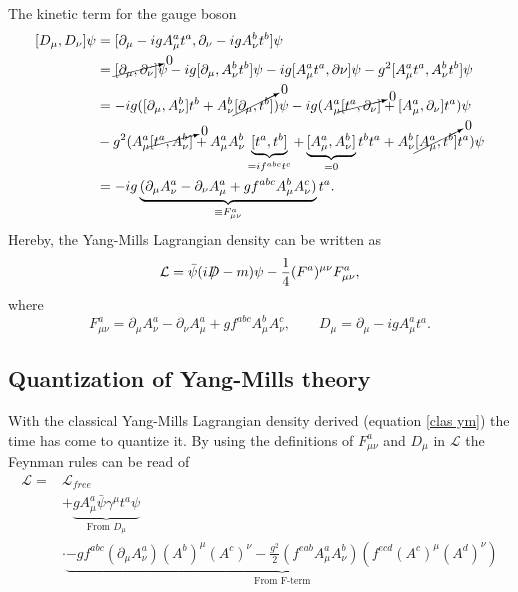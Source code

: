 The kinetic term for the gauge boson
\begin{equation}
	\begin{split}
		[D_\mu,D_\nu]\psi&=[\partial_\mu-igA_\mu^at^a,\partial_\nu-igA_\nu^bt^b]\psi\\
		&=\cancelto{0}{[\partial_\mu,\partial_\nu]}\psi-ig[\partial_\mu,A_\nu^bt^b]\psi-ig[A_\mu^at^a,\partial\nu]\psi-g^2[A_\mu^at^a,A_\nu^bt^b]\psi\\
		&=-ig([\partial_\mu,A_\nu^b]t^b+A_\nu^b\cancelto{0}{[\partial_\mu,t^b]})\psi-ig(A_\mu^a\cancelto{0}{[t^a,\partial_\nu]}+[A_\mu^a,\partial_\nu]t^a)\psi\\
		&-g^2(A_\mu^a\cancelto{0}{[t^a,A_\nu^b]}+A_\mu^aA_\nu^b\underbrace{[t^a,t^b]}_{=if^{abc}t^c}+\underbrace{[A_\mu^a,A_\nu^b]}_{=0}t^bt^a+A_\nu^b\cancelto{0}{[A_\mu^a,t^b]}t^a)\psi\\
		&=-ig\underbrace{(\partial_\mu A_\nu^a-\partial_\nu A_\mu^a+gf^{abc}A_\mu^bA_\nu^c)}_{\equiv F_{\mu\nu}^a}t^a.\\
	\end{split}
\end{equation} 
Hereby, the Yang-Mills Lagrangian density can be written as
\begin{equation}
	\mathcal{L}=\bar{\psi}(i\slashed D-m)\psi-\frac{1}{4}(F^a)^{\mu\nu}F^a_{\mu\nu},
	\label{clas ym}
\end{equation} 
where
\begin{equation}
	F_{\mu\nu}^a=\partial_\mu A_\nu^a-\partial_\nu A_\mu^a+gf^{abc}A_\mu^bA_\nu^c, \qquad D_\mu=\partial_\mu-igA_\mu^at^a.
\end{equation} 

\subsection*{Quantization of Yang-Mills theory}
With the classical Yang-Mills Lagrangian density derived (equation \eqref{clas ym}) the time has come to quantize it. By using the definitions of $F_{\mu\nu}^a$ and $D_\mu$ in $\mathcal{L}$ the Feynman rules can be read of
\begin{equation}
	\begin{split}
		\mathcal{L}=&\mathcal{L}_{free}\\
		&+\underbrace{gA_\mu^a\bar{\psi}\gamma^\mu t^a\psi}_{\text{From }D_\mu}\\
		&\cdot\underbrace{-gf^{abc}(\partial_\mu A_\nu^a)(A^b)^\mu(A^c)^\nu-\frac{g^2}{2}(f^{eab}A_\mu^aA_\nu^b)(f^{ecd}(A^c)^\mu(A^d)^\nu)}_{\text{From F-term}}
	\end{split}
\end{equation} 

